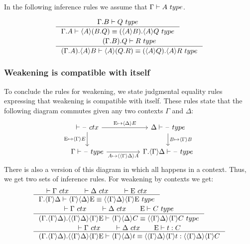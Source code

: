 In the following inference rules we assume that $\jtype{\Gamma}{A}$.

\begin{align}
& \inference
  {\jtype{\ctxext{\Gamma}{B}}{Q}}
  {\jtypeeq{\ctxext{\Gamma}{A}}{\ctxwk{A}{\ctxext{B}{Q}}}{\ctxext{\ctxwk{A}{B}}{\ctxwk{A}{Q}}}}\\
& \inference
  {\jtype{\ctxext{{\Gamma}{B}}{Q}}{R}}
  {\jtypeeq
    {\ctxext{{\Gamma}{A}}{\ctxwk{A}{B}}}
    {\ctxwk{A}{\ctxext{Q}{R}}}
    {\ctxext{\ctxwk{A}{Q}}{\ctxwk{A}{R}}}}
\end{align}

\subsubsection{Weakening is compatible with itself}
To conclude the rules for weakening, we state judgmental equality rules expressing
that weakening is compatible with itself. These rules state that the following
diagram commutes given any two contexts $\Gamma$ and $\Delta$:
\begin{equation*}
\begin{tikzcd}[column sep=huge]
\jctx{\blank} \ar{r}{\greek{E}\mapsto\ctxwk{\Delta}{E}} \ar{d}[swap]{\greek{E}\mapsto\ctxwk{\Gamma}{E}} & \jtype{\Delta}{\blank} \ar{d}{B\mapsto\ctxwk{\Gamma}{B}}\\
\jtype{\Gamma}{\blank} \ar{r}[swap]{A\mapsto\ctxwk{{\Gamma}{\Delta}}{A}} & \jtype{\ctxext{\Gamma}{\ctxwk{\Gamma}{\Delta}}}{\blank}
\end{tikzcd}
\end{equation*}
There is also a version of this diagram in which all happens in a context. Thus,
we get two sets of inference rules. For weakening by contexts we get:
\begin{align}
& \inference{\jctx{\Gamma}\qquad\jctx{\Delta}\qquad\jctx{\greek{E}}}
          {\jtypeeq{\ctxext{\Gamma}{\ctxwk{\Gamma}{\Delta}}}{\ctxwk{\Gamma}{{\Delta}{\greek{E}}}}
            {\ctxwk{{\Gamma}{\Delta}}{{\Gamma}{\greek{E}}}}}\\
& \inference{\jctx{\Gamma}\qquad\jctx{\Delta}\qquad\jtype{\greek{E}}{C}}
          {\jtypeeq{\ctxext{{\Gamma}{\ctxwk{\Gamma}{\Delta}}}{\ctxwk{{\Gamma}{\Delta}}{{\Gamma}{\greek{E}}}}}
            {\ctxwk{\Gamma}{{\Delta}{C}}}
            {\ctxwk{{\Gamma}{\Delta}}{{\Gamma}{C}}}}\\
& \inference{\jctx{\Gamma}\qquad\jctx{\Delta}\qquad\jterm{\greek{E}}{C}{t}}
          {\jtermeq{\ctxext{{\Gamma}{\ctxwk{\Gamma}{\Delta}}}{\ctxwk{{\Gamma}{\Delta}}{{\Gamma}{\greek{E}}}}}
            {\ctxwk{{\Gamma}{\Delta}}{{\Gamma}{C}}}{\ctxwk{\Gamma}{{\Delta}{t}}}{\ctxwk{{\Gamma}{\Delta}}{{\Gamma}{t}}}}
\end{align}
